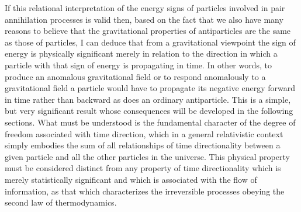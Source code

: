 \documentclass[notitlepage,12pt]{report}
\begin{document}
If this relational interpretation of the energy signs of particles involved in pair annihilation processes is valid then, based on the fact that we also have many reasons to believe that the gravitational properties of antiparticles are the same as those of particles, I can deduce that from a gravitational viewpoint the sign of energy is physically significant merely in relation to the direction in which a particle with that sign of energy is propagating in time. In other words, to produce an anomalous gravitational field or to respond anomalously to a gravitational field a particle would have to propagate its negative energy forward in time rather than backward as does an ordinary antiparticle. This is a simple, but very significant result whose consequences will be developed in the following sections. What must be understood is the fundamental character of the degree of freedom associated with time direction, which in a general relativistic context simply embodies the sum of all relationships of time directionality between a given particle and all the other particles in the universe. This physical property must be considered distinct from any property of time directionality which is merely statistically significant and which is associated with the flow of information, as that which characterizes the irreversible processes obeying the second law of thermodynamics.

\bigskip
\end{document}
